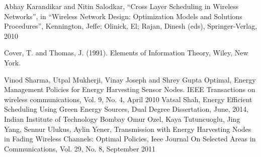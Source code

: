 \documentclass[a4paper,11pt]{article}
\begin{document}
\begin{thebibliography}{4}

Abhay Karandikar and Nitin Salodkar, “Cross Layer Scheduling in Wireless Networks”,  in “Wireless Network Design: Optimization Models and Solutions Procedures”, Kennington, Jeffe; Olinick, El; Rajan, Dinesh (eds), Springer-Verlag, 2010

Cover, T. and Thomas, J. (1991). Elements of Information Theory, Wiley, New York.

Vinod Sharma, Utpal Mukherji, Vinay Joseph and Shrey Gupta Optimal, Energy Management Policies for Energy Harvesting Sensor Nodes. IEEE Transactions on wireless communications, Vol. 9, No. 4, April 2010
Vatsal Shah, Energy Efficient Scheduling Using Green Energy Sources, Dual Degree Dissertation, June, 2014, Indian Institute of Technology Bombay
Omur Ozel, Kaya Tutuncuoglu, Jing Yang, Sennur Ulukus, Aylin Yener, Transmission with Energy Harvesting Nodes in Fading Wireless Channels: Optimal Policies, Ieee Journal On Selected Areas in Communications, Vol. 29, No. 8, September 2011
\end{thebibliography}
\end{document}
